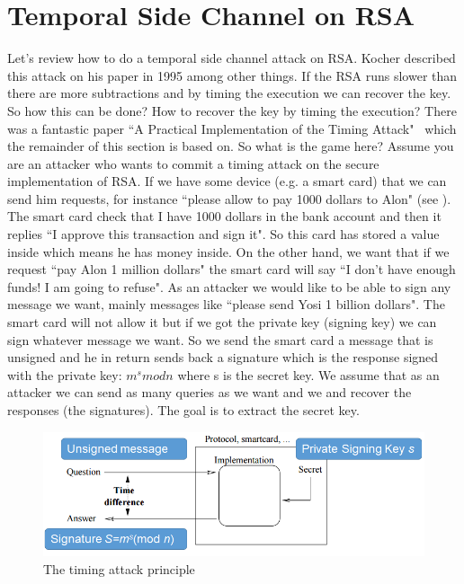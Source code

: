 \section{Temporal Side Channel on RSA}\label{sec:Temporal Side Channel on RSA}

Let's review how to do a temporal side channel attack on RSA. Kocher described this
attack on his paper in 1995 among other things. If the RSA runs slower than
there are more subtractions and by timing the execution we can recover the key.
So how this can be done? How to recover the key by timing the execution? 
There was a fantastic paper ``A Practical Implementation of the Timing
Attack"~\cite{dhem1998practical} which the remainder of this section is based
on. So what is the game here? Assume you are an attacker who wants to commit a
timing attack on the secure implementation of RSA. If we have some device 
(e.g. a smart card) that we can send him requests, 
for instance ``please allow to pay 1000 dollars
to Alon" (see ). The smart card check that I have 1000
dollars in the bank account and then it replies ``I approve this transaction and
sign it". So this card has stored a value inside which means he has money inside.
On the other hand, we want that if we request ``pay Alon 1 million dollars" 
the smart card will say ``I don't have enough funds! I am going to refuse". 
As an attacker we would like to be able to sign any message we want,
mainly messages like ``please send Yosi 1 billion dollars". 
The smart card will not allow it but if we got the private key (signing key)
we can sign whatever message we want. So we send the
smart card a message that is unsigned and he in return sends back a signature
which is the response signed with the private key: \(m^s mod n\) where s is the
secret key. We assume that as an attacker we can send as many queries as we want and we
and recover the responses (the signatures). The goal is to extract the
secret key. 

\begin{figure}[!ht]
    \centering
    \includegraphics[scale=0.4]{images/smartcard.png}
    \caption{The timing attack principle} \label{fig:smart card}
\end{figure}

